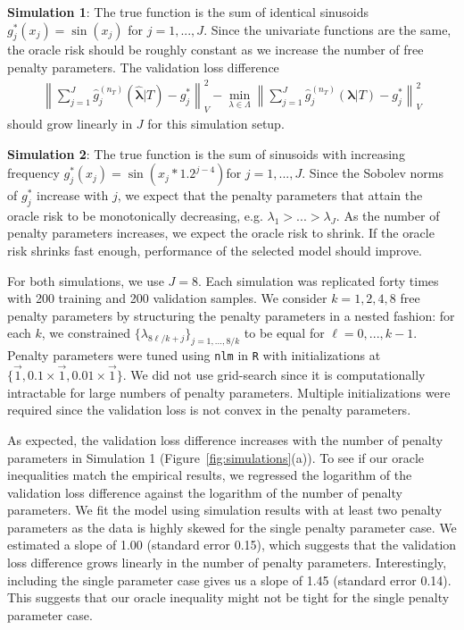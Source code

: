 \documentclass[12pt]{article} %
\theoremstyle{definition}
\begin{document}
\noindent \textbf{Simulation 1}: The true function is the sum of identical sinusoids
$g_j^*(x_j) = \sin(x_j)$ for $j = 1,...,J$.
Since the univariate functions are the same, the oracle risk should be roughly constant as we increase the number of free penalty parameters.
The validation loss difference
\begin{align}
\left \| \sum_{j=1}^J \hat{g}^{(n_T)}_j(\hat{\boldsymbol{\lambda}}|T) - g^*_j \right \|_V^2 - 
\min_{\lambda \in \Lambda}
\left \| \sum_{j=1}^J \hat{g}^{(n_T)}_j(\boldsymbol{\lambda} | T) - g^*_j \right \|_V^2
\label{eq:excess_risk_sim}
\end{align}
should grow linearly in $J$ for this simulation setup.

\noindent \textbf{Simulation 2}: The true function is the sum of sinusoids with increasing frequency
$g_j^*(x_j) = \sin(x_j * 1.2^{j - 4})$for $j = 1,...,J$.
Since the Sobolev norms of $g_j^*$ increase with $j$, we expect that the penalty parameters that attain the oracle risk to be monotonically decreasing, e.g. ${\lambda}_1 > ... > {\lambda}_J$. 
As the number of penalty parameters increases, we expect the oracle risk to shrink.
If the oracle risk shrinks fast enough, performance of the selected model should improve.

For both simulations, we use $J = 8$.
Each simulation was replicated forty times with 200 training and 200 validation samples.
We consider $k = 1, 2, 4, 8$ free penalty parameters by structuring the penalty parameters in a nested fashion: for each $k$, we constrained $\{\lambda_{8\ell/k + j} \}_{j = 1,...,8/k}$ to be equal for $\ell= 0,...,k - 1$.
Penalty parameters were tuned using \texttt{nlm} in \texttt{R} with initializations at $\{\vec{1}, 0.1 \times \vec{1}, 0.01 \times \vec{1}\}$. 
We did not use grid-search since it is computationally intractable for large numbers of penalty parameters.
Multiple initializations were required since the validation loss is not convex in the penalty parameters.

As expected, the validation loss difference increases with the number of penalty parameters in Simulation 1 (Figure~\ref{fig:simulations}(a)).
To see if our oracle inequalities match the empirical results, we regressed the logarithm of the validation loss difference against the logarithm of the number of penalty parameters.
We fit the model using simulation results with at least two penalty parameters as the data is highly skewed for the single penalty parameter case.
We estimated a slope of 1.00 (standard error 0.15), which suggests that the validation loss difference grows linearly in the number of penalty parameters.
Interestingly, including the single parameter case gives us a slope of 1.45 (standard error 0.14).
This suggests that our oracle inequality might not be tight for the single penalty parameter case.
\end{document}
